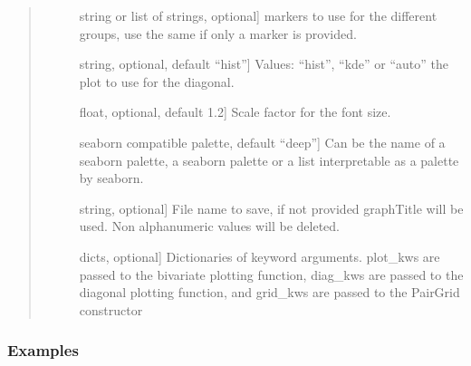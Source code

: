 \documentclass[letterpaper,10pt,english]{sphinxmanual}
\begin{document}
\begin{fulllineitems}
\begin{quote}
\begin{description}
\begin{description}
\item[{}] \leavevmode{[}string or list of strings, optional{]}
markers to use for the different groups, 
use the same if only a marker is provided.

\item[{}] \leavevmode{[}string, optional, default “hist”{]}
Values: “hist”, “kde” or “auto” the plot to use for the diagonal.

\item[{}] \leavevmode{[}float, optional, default 1.2{]}
Scale factor for the font size.

\item[{}] \leavevmode{[}seaborn compatible palette, default “deep”{]}
Can be the name of a seaborn palette, 
a seaborn palette or a list 
interpretable as a palette by seaborn.

\item[{}] \leavevmode{[}string, optional{]}
File name to save, if not provided graphTitle will be used. 
Non alphanumeric values will be deleted.

\item[{}] \leavevmode{[}dicts, optional{]}
Dictionaries of keyword arguments. 
plot\_kws are passed to the bivariate plotting function, 
diag\_kws are passed to the diagonal plotting function, 
and grid\_kws are passed to the PairGrid constructor

\end{description}

\end{description}\end{quote}
\subsubsection*{Examples}


\end{fulllineitems}
\end{document}
